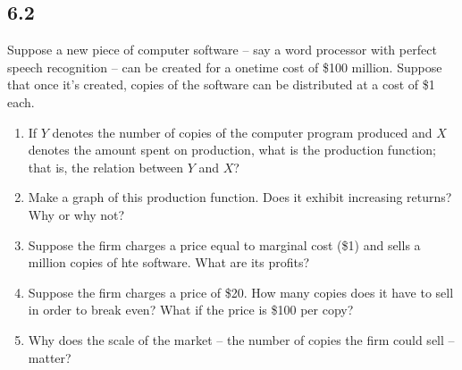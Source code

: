 \documentclass{article}
\begin{document}
\subsection*{6.2}

Suppose a new piece of computer software -- say a word processor with perfect speech recognition -- can be created for a onetime cost of \$100 million. Suppose that once it's created, copies of the software can be distributed at a cost of \$1 each.

\begin{enumerate}
\item If $Y$ denotes the number of copies of the computer program produced and $X$ denotes the amount spent on production, what is the production function; that is, the relation between $Y$ and $X$?
\item Make a graph of this production function. Does it exhibit increasing returns? Why or why not?
\item Suppose the firm charges a price equal to marginal cost (\$1) and sells a million copies of hte software. What are its profits?
\item Suppose the firm charges a price of \$20. How many copies does it have to sell in order to break even? What if the price is \$100 per copy?
\item Why does the scale of the market -- the number of copies the firm could sell -- matter?
\end{enumerate}
\end{document}
